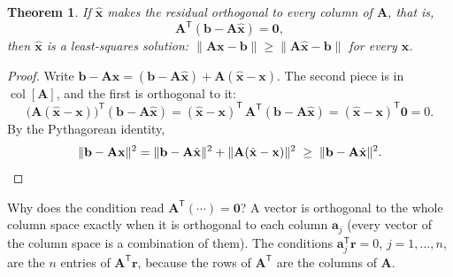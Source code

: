\documentclass[11pt]{article}
\theoremstyle{plain}
\newtheorem{thm}{Theorem}[section]
\theoremstyle{definition}
\theoremstyle{remark}
\newcommand{\vc}[1]{\mathbf{#1}}
\newcommand{\mt}[1]{\mathbf{#1}}
\newcommand{\norm}[1]{\lVert #1\rVert}
\newcommand{\T}{^{\mathsf{T}}}
\newcommand{\colsp}[1]{\operatorname{col}[#1]}
\newcommand{\xh}{\hat{\vc{x}}}
\begin{document}
\begin{thm}
\label{thm:perp}
If $\xh$ makes the residual orthogonal to every column of $\mt{A}$, that is,
\[
  \mt{A}\T(\vc{b}-\mt{A}\xh)=\vc{0},
\]
then $\xh$ is a least-squares solution: $\norm{\mt{A}\vc{x}-\vc{b}}\ge\norm{\mt{A}\xh-\vc{b}}$
for every $\vc{x}$.
\end{thm}

\begin{proof}
Write $\vc{b}-\mt{A}\vc{x}=(\vc{b}-\mt{A}\xh)+\mt{A}(\xh-\vc{x})$. The second
piece is in $\colsp{\mt{A}}$, and the first is orthogonal to it:
\[
  \bigl(\mt{A}(\xh-\vc{x})\bigr)\T(\vc{b}-\mt{A}\xh)
  =(\xh-\vc{x})\T\,\mt{A}\T(\vc{b}-\mt{A}\xh)=(\xh-\vc{x})\T\vc{0}=0 .
\]
By the Pythagorean identity,
\[
  \norm{\vc{b}-\mt{A}\vc{x}}^{2}=\norm{\vc{b}-\mt{A}\xh}^{2}+\norm{\mt{A}(\xh-\vc{x})}^{2}
  \;\ge\;\norm{\vc{b}-\mt{A}\xh}^{2}.\qedhere
\]
\end{proof}

\noindent Why does the condition read $\mt{A}\T(\cdots)=\vc{0}$? A vector is
orthogonal to the whole column space exactly when it is orthogonal to each column
$\vc{a}_j$ (every vector of the column space is a combination of them). The
conditions $\vc{a}_j\T\vc{r}=0$, $j=1,\dots,n$, are the $n$ entries of
$\mt{A}\T\vc{r}$, because the rows of $\mt{A}\T$ are the columns of $\mt{A}$.

\begin{center}
\end{center}
\end{document}

